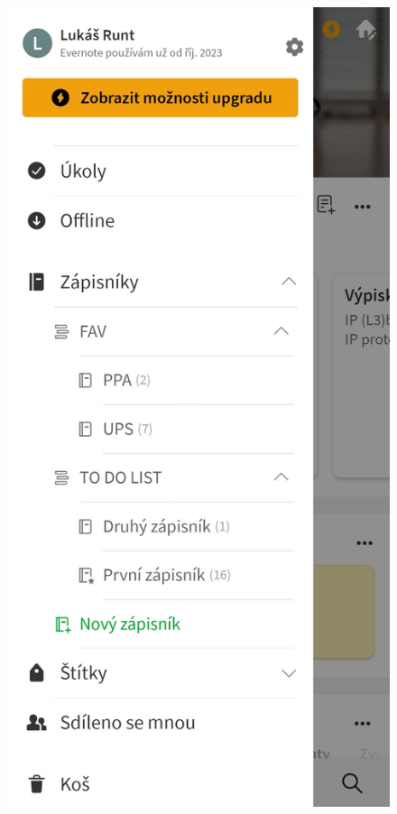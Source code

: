 \documentclass[czech, bc, kiv, he, iso690numb]{fasthesis}
\begin{document}
\begin{figure}[h!]
  \centering
  \begin{minipage}[h]{0.3\textwidth}
    \includegraphics[width=\textwidth]{img/BP-Runt/Evernote/Evernote_hierarchie_v_liste.jpg}

\end{minipage}
\end{figure}
\end{document}
